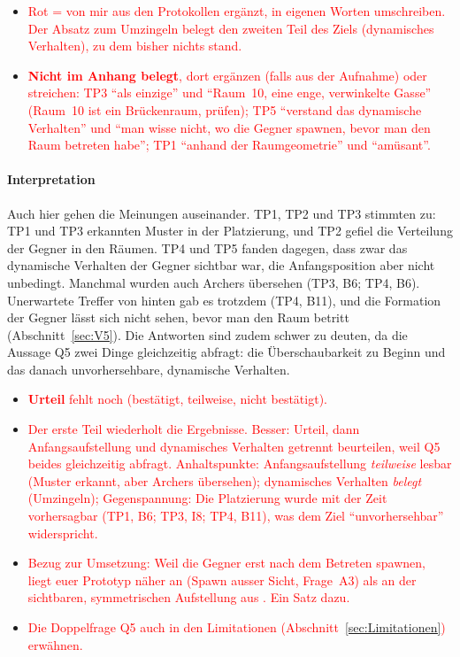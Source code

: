 \documentclass[../Main.tex]{subfiles}
\begin{document}
\begin{itemize}[leftmargin=1.5cm]
    \item \textcolor{red}{Rot = von mir aus den Protokollen ergänzt, in eigenen Worten umschreiben. Der Absatz zum Umzingeln belegt den zweiten Teil des Ziels (dynamisches Verhalten), zu dem bisher nichts stand.}
    \item \textcolor{red}{\textbf{Nicht im Anhang belegt}, dort ergänzen (falls aus der Aufnahme) oder streichen: TP3 \enquote{als einzige} und \enquote{Raum~10, eine enge, verwinkelte Gasse} (Raum~10 ist ein Brückenraum, prüfen); TP5 \enquote{verstand das dynamische Verhalten} und \enquote{man wisse nicht, wo die Gegner spawnen, bevor man den Raum betreten habe}; TP1 \enquote{anhand der Raumgeometrie} und \enquote{amüsant}.}
\end{itemize}

\paragraph{Interpretation}
Auch hier gehen die Meinungen auseinander. TP1, TP2 und TP3 stimmten zu: TP1 und TP3 erkannten Muster in der Platzierung, und TP2 gefiel die Verteilung der Gegner in den Räumen. TP4 und TP5 fanden dagegen, dass zwar das dynamische Verhalten der Gegner sichtbar war, die Anfangsposition aber nicht unbedingt. Manchmal wurden auch Archers übersehen (TP3, B6; TP4, B6). Unerwartete Treffer von hinten gab es trotzdem (TP4, B11), und die Formation der Gegner lässt sich nicht sehen, bevor man den Raum betritt (Abschnitt~\ref{sec:V5}). Die Antworten sind zudem schwer zu deuten, da die Aussage Q5 zwei Dinge gleichzeitig abfragt: die Überschaubarkeit zu Beginn und das danach unvorhersehbare, dynamische Verhalten.

\begin{itemize}[leftmargin=1.5cm]
    \item \textcolor{red}{\textbf{Urteil} fehlt noch (bestätigt, teilweise, nicht bestätigt).}
    \item \textcolor{red}{Der erste Teil wiederholt die Ergebnisse. Besser: Urteil, dann Anfangsaufstellung und dynamisches Verhalten getrennt beurteilen, weil Q5 beides gleichzeitig abfragt. Anhaltspunkte: Anfangsaufstellung \emph{teilweise} lesbar (Muster erkannt, aber Archers übersehen); dynamisches Verhalten \emph{belegt} (Umzingeln); Gegenspannung: Die Platzierung wurde mit der Zeit vorhersagbar (TP1, B6; TP3, I8; TP4, B11), was dem Ziel \enquote{unvorhersehbar} widerspricht.}
    \item \textcolor{red}{Bezug zur Umsetzung: Weil die Gegner erst nach dem Betreten spawnen, liegt euer Prototyp näher an  (Spawn ausser Sicht, Frage~A3) als an der sichtbaren, symmetrischen Aufstellung aus . Ein Satz dazu.}
    \item \textcolor{red}{Die Doppelfrage Q5 auch in den Limitationen (Abschnitt~\ref{sec:Limitationen}) erwähnen.}
\end{itemize}
\end{document}
